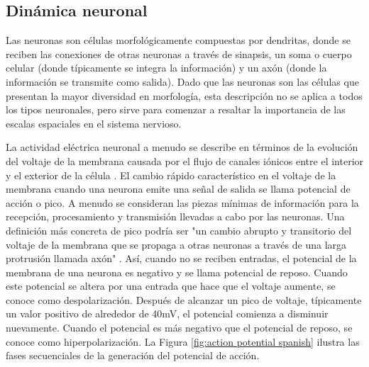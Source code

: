 \subsection{Dinámica neuronal}
Las neuronas son células morfológicamente compuestas por dendritas, donde se reciben las conexiones de otras neuronas a través de sinapsis, un soma o cuerpo celular (donde típicamente se integra la información) y un axón (donde la información se transmite como salida). Dado que las neuronas son las células que presentan la mayor diversidad en morfología, esta descripción no se aplica a todos los tipos neuronales, pero sirve para comenzar a resaltar la importancia de las escalas espaciales en el sistema nervioso.

La actividad eléctrica neuronal a menudo se describe en términos de la evolución del voltaje de la membrana causada por el flujo de canales iónicos entre el interior y el exterior de la célula \parencite{kandel_principles_2012}. El cambio rápido característico en el voltaje de la membrana cuando una neurona emite una señal de salida se llama potencial de acción o pico. A menudo se consideran las piezas mínimas de información para la recepción, procesamiento y transmisión llevadas a cabo por las neuronas. Una definición más concreta de pico podría ser "un cambio abrupto y transitorio del voltaje de la membrana que se propaga a otras neuronas a través de una larga protrusión llamada axón" \parencite{izhikevich_dynamical_2007}. Así, cuando no se reciben entradas, el potencial de la membrana de una neurona es negativo y se llama potencial de reposo. Cuando este potencial se altera por una entrada que hace que el voltaje aumente, se conoce como despolarización. Después de alcanzar un pico de voltaje, típicamente un valor positivo de alrededor de 40mV, el potencial comienza a disminuir nuevamente. Cuando el potencial es más negativo que el potencial de reposo, se conoce como hiperpolarización. La Figura \ref{fig:action potential spanish} ilustra las fases secuenciales de la generación del potencial de acción.

